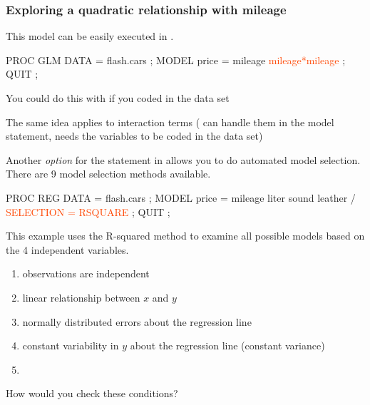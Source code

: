 \begin{frame}[fragile]
\frametitle{Exploring a quadratic relationship with mileage}
This model can be easily executed in .
\vskip5pt
\footnotesize
\begin{code}{.0}
PROC GLM DATA = flash.cars ;
  MODEL price = mileage \textcolor{OrangeRed}{mileage*mileage} ;
QUIT ;
\end{code}
\emp
\vskip5pt
\bi
\item You could do this with  if you coded  in the data set
\item The same idea applies to interaction terms ( can handle them in the model statement,  needs the variables to be coded in the data set)
\ei
\end{frame}

\begin{frame}[fragile]
Another \emph{option} for the  statement in  allows you to do automated model selection.  There are 9 model selection methods available.
\vskip5pt
\footnotesize
\begin{code}{.0}
PROC REG DATA = flash.cars ;
  MODEL price = mileage liter sound leather /
     \textcolor{OrangeRed}{SELECTION = RSQUARE} ;
QUIT ;
\end{code}
\emp
\vskip5pt
This example uses the R-squared method to examine all possible models based on the 4 independent variables.
\end{frame}

\begin{frame}
\begin{enumerate}
\item observations are independent
\item linear relationship between $x$ and $y$
\item normally distributed errors about the regression line
\item constant variability in $y$ about the regression line (constant variance)
\item[]
\end{enumerate}
\oyo How would you check these conditions?
\end{frame}

 